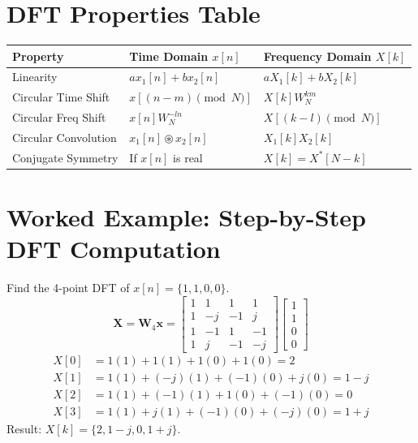 \documentclass[11pt,a4paper]{article}
\begin{document}
\section{DFT Properties Table}
\begin{table}[H]
\centering
\begin{tabular}{lll}
\toprule
\textbf{Property} & \textbf{Time Domain $x[n]$} & \textbf{Frequency Domain $X[k]$} \\
\midrule
Linearity & $a x_1[n] + b x_2[n]$ & $a X_1[k] + b X_2[k]$ \\
Circular Time Shift & $x[(n - m) \pmod N]$ & $X[k] W_N^{km}$ \\
Circular Freq Shift & $x[n] W_N^{-ln}$ & $X[(k - l) \pmod N]$ \\
Circular Convolution & $x_1[n] \circledast x_2[n]$ & $X_1[k] X_2[k]$ \\
Conjugate Symmetry & If $x[n]$ is real & $X[k] = X^*[N-k]$ \\
\bottomrule
\end{tabular}
\end{table}

\section{Worked Example: Step-by-Step DFT Computation}
Find the 4-point DFT of $x[n] = \{1, 1, 0, 0\}$.
\begin{equation*}
\mathbf{X} = \mathbf{W}_4 \mathbf{x} = \begin{bmatrix}
1 & 1 & 1 & 1 \\
1 & -j & -1 & j \\
1 & -1 & 1 & -1 \\
1 & j & -1 & -j
\end{bmatrix} \begin{bmatrix} 1 \\ 1 \\ 0 \\ 0 \end{bmatrix}
\end{equation*}
\begin{align*}
X[0] &= 1(1) + 1(1) + 1(0) + 1(0) = 2 \\
X[1] &= 1(1) + (-j)(1) + (-1)(0) + j(0) = 1 - j \\
X[2] &= 1(1) + (-1)(1) + 1(0) + (-1)(0) = 0 \\
X[3] &= 1(1) + j(1) + (-1)(0) + (-j)(0) = 1 + j
\end{align*}
Result: $X[k] = \{2, 1-j, 0, 1+j\}$.
\end{document}

